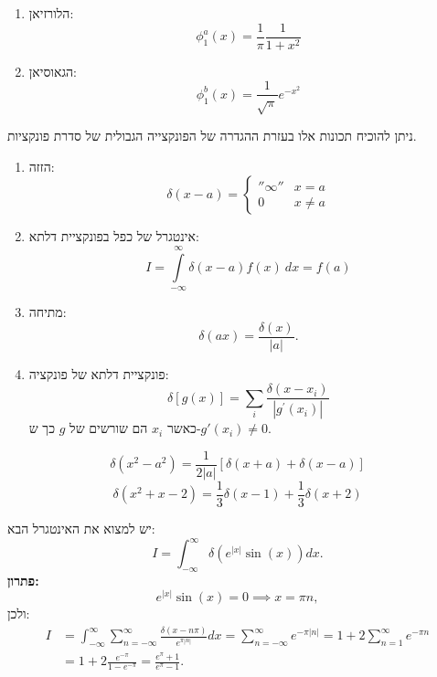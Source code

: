 \documentclass{tstextbook}
\begin{document}
\begin{enumerate}
  \item הלורזיאן: 
$$ \phi_1^a(x)=\frac{1}{\pi}\frac{1}{1+x^2}$$


  \item הגאוסיאן: 
$$ \phi_1^b(x)=\frac{1}{\sqrt{\pi}}e^{-x^2}$$


\end{enumerate}
\begin{proposition}
ניתן להוכיח תכונות אלו בעזרת ההגדרה של הפונקצייה הגבולית של סדרת פונקציות.

  \begin{enumerate}
    \item הזזה: 
$$ \delta(x-a)=\left\{\begin{array}{ll}''\infty''&x=a\\0&x\neq a\end{array}\right.$$


    \item אינטגרל של כפל בפונקציית דלתא: 
$$ I=\displaystyle\int\limits_{-\infty}^{\infty}\delta(x-a)f(x)\:dx=f(a)$$


    \item מתיחה: 
$$ \delta(ax)=\frac{\delta(x)}{|a|}.$$


    \item פונקציית דלתא של פונקציה: 
$$ \delta\left[g\left(x\right)\right]=\sum_{i}\frac{\delta\left(x-x_{i}\right)}{\left|g^{\prime}\left(x_{i}\right)\right|}$$
כאשר \(x_{i}\) הם שורשים של \(g\) כך ש-\(g'(x_{i})\neq 0\). 


  \end{enumerate}
\end{proposition}
\begin{example}
$$ \delta\left(x^2-a^2\right)=\frac1{2\left|a\right|}\left[\delta\left(x+a\right)+\delta\left(x-a\right)\right]$$$$ \delta\left(x^2+x-2\right)=\frac13\delta\left(x-1\right)+\frac13\delta\left(x+2\right)$$

יש למצוא את האינטגרל הבא:
$$ I=\int_{-\infty}^{\infty}\delta\left(e^{|x|}\sin(x)\right)dx.$$\textbf{פתרון:}$$ e^{|x|}\sin(x)=0\implies x=\pi n,$$
ולכן:
$$ \begin{aligned}I&=\int_{-\infty}^{\infty}\sum_{n=-\infty}^{\infty}\frac{\delta\left(x-n\pi\right)}{e^{\pi|n|}}dx=\sum_{n=-\infty}^{\infty}e^{-\pi|n|}=1+2\sum_{n=1}^{\infty}e^{-\pi n}\\&=1+2\frac{e^{-\pi}}{1-e^{-\pi}}=\frac{e^{\pi}+1}{e^{\pi}-1}.\end{aligned}$$

\end{example}
\end{document}
